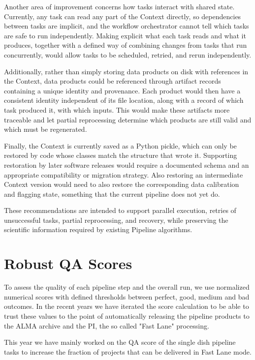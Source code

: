 \documentclass[11pt,twoside]{article}
\begin{document}
Another area of improvement concerns how tasks interact with shared
state. Currently, any task can read any part of the Context
directly, so dependencies between tasks are implicit, and the workflow
orchestrator cannot tell which tasks are safe to run independently.
Making explicit what each task reads and what it produces, together with
a defined way of combining changes from tasks that run concurrently,
would allow tasks to be scheduled, retried, and rerun independently.

Additionally, rather than simply storing data products on disk with
references in the Context, data products could be referenced through
artifact records containing a unique identity and provenance. Each
product would then have a consistent identity independent of its file
location, along with a record of which task produced it, with which
inputs. This would make these artifacts more traceable and let partial
reprocessing determine which products are still valid and which must be
regenerated.

Finally, the Context is currently saved as a Python pickle, which can
only be restored by code whose classes match the structure that wrote it.
Supporting restoration by later software releases would require a
documented schema and an appropriate compatibility or migration strategy.
Also restoring an intermediate Context version would need to also restore
the corresponding data calibration and flagging state, something that the
current pipeline does not yet do.

These recommendations are intended to support parallel execution,
retries of unsuccessful tasks, partial reprocessing, and recovery, while
preserving the scientific information required by existing Pipeline
algorithms.

\section{Robust QA Scores}
To assess the quality of each pipeline step and the overall run, we use
normalized numerical scores with defined thresholds between
perfect, good, medium and bad outcomes. In the recent years we have
iterated the score calculation to be able to trust these values to the
point of automatically releasing the pipeline products to the ALMA
archive and the PI, the so called "Fast Lane" processing.

This year we have mainly worked on the QA score of the single dish
pipeline tasks to increase the fraction of projects that can be delivered
in Fast Lane mode.
\end{document}
